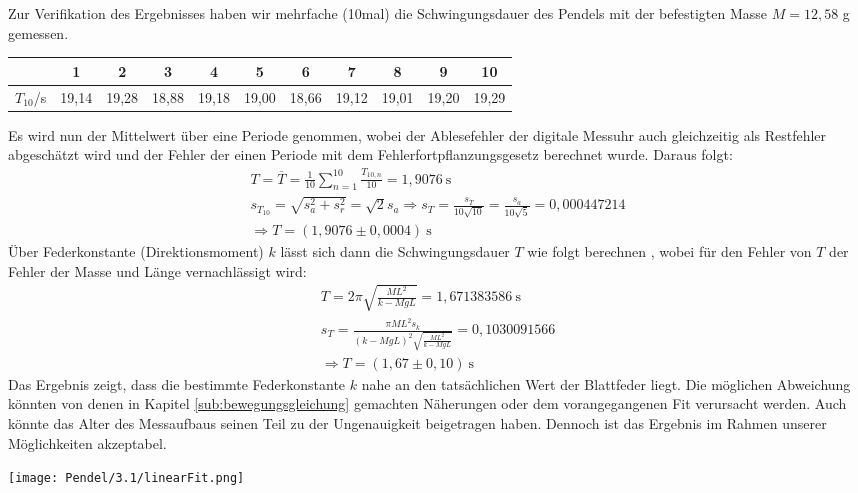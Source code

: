 Zur Verifikation des Ergebnisses haben wir mehrfache (10mal) die Schwingungsdauer des Pendels mit der befestigten Masse $M = 12,58$ g gemessen.
\begin{center}
    \begin{tabular}{ c | cccccccccc }
        {} & 1 & 2 & 3 &4 &5 &6 &7 &8 &9 &10\\
        \hline
        $T_10$/s&19,14&19,28&18,88&19,18&19,00&18,66&19,12&19,01&19,20&19,29\\
    \end{tabular}
    \label{tab:schwingung}
\end{center}
Es wird nun der Mittelwert über eine Periode genommen, wobei der Ablesefehler der digitale Messuhr auch gleichzeitig als Restfehler abgeschätzt wird und der Fehler der einen Periode mit dem Fehlerfortpflanzungsgesetz berechnet wurde. Daraus folgt:
\begin{gather}
    T = \overline{T} = \frac{1}{10} \sum_{n = 1}^{10} \frac{T_{10,n}}{10} = 1,9076~\text{s}\\
    s_{T_{10}} = \sqrt{s_a^2+s_r^2}=\sqrt{2}s_a \Rightarrow s_T = \frac{s_T}{10\sqrt{10}} = \frac{s_a}{10\sqrt{5}} = 0,000447214\\[0,5cm]
    \Rightarrow\boxed{T = (1,9076 \pm 0,0004)~\text{s}}
\end{gather}
\newpage
Über Federkonstante (Direktionsmoment) $k$ lässt sich dann die Schwingungsdauer $T$ wie folgt berechnen \citep{Leifi}, wobei für den Fehler von $T$ der Fehler der Masse und Länge vernachlässigt wird:
\begin{gather}
    T = 2\pi\sqrt{\frac{ML^2}{k- MgL}} = 1,671383586~\text{s}\\
    s_T = \frac{\pi ML^2 s_k}{(k-MgL)^2 \sqrt{\frac{ML^2}{k- MgL}}} = 0,1030091566\\[0,5cm]
    \Rightarrow\boxed{T = (1,67 \pm 0,10)~\text{s}}
\end{gather}
Das Ergebnis zeigt, dass die bestimmte Federkonstante $k$ nahe an den tatsächlichen Wert der Blattfeder liegt. Die möglichen Abweichung könnten von denen in Kapitel \ref{sub:bewegungsgleichung} gemachten Näherungen oder dem vorangegangenen Fit verursacht werden. Auch könnte das Alter des Messaufbaus seinen Teil zu der Ungenauigkeit beigetragen haben. Dennoch ist das Ergebnis im Rahmen unserer Möglichkeiten akzeptabel.
\newpage
\begin{center}
    \texttt{[image: Pendel/3.1/linearFit.png]}
    \label{image:linFit}
\end{center}